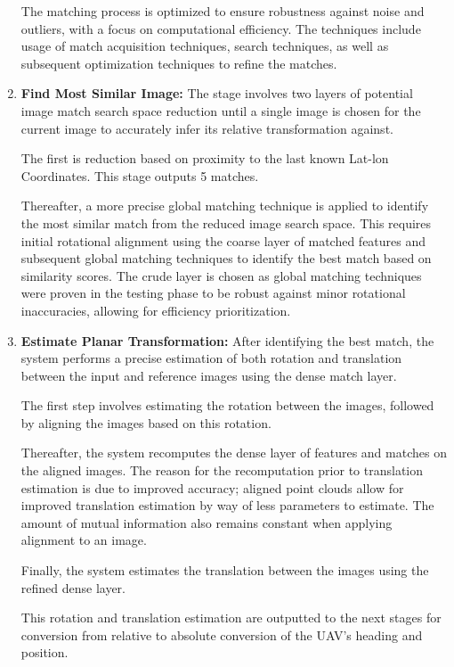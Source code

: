 \begin{enumerate}
    The matching process is optimized to ensure robustness against noise and outliers, with a focus on computational efficiency. The techniques include usage of match acquisition techniques, search techniques, as well as subsequent optimization techniques to refine the matches.
    
    \item \textbf{Find Most Similar Image:}  
    The stage involves two layers of potential image match search space reduction until a single image is chosen for the current image to accurately infer its relative transformation against. 
    
    The first is reduction based on proximity to the last known Lat-lon Coordinates. This stage outputs 5 matches. 
    
    Thereafter, a more precise global matching technique is applied to identify the most similar match from the reduced image search space. This requires initial rotational alignment using the coarse layer of matched features and subsequent global matching techniques to identify the best match based on similarity scores. The crude layer is chosen as global matching techniques were proven in the testing phase to be robust against minor rotational inaccuracies, allowing for efficiency prioritization. 


    \item \textbf{Estimate Planar Transformation:}  
    After identifying the best match, the system performs a precise estimation of both rotation and translation between the input and reference images using the dense match layer. 
    
    The first step involves estimating the rotation between the images, followed by aligning the images based on this rotation. 
    
    Thereafter, the system recomputes the dense layer of features and matches on the aligned images. The reason for the recomputation prior to translation estimation is due to improved accuracy; aligned point clouds allow for improved translation estimation by way of less parameters to estimate. The amount of mutual information also remains constant when applying alignment to an image. 

    Finally, the system estimates the translation between the images using the refined dense layer. 

    This rotation and translation estimation are outputted to the next stages for conversion from relative to absolute conversion of the UAV's heading and position. 


\end{enumerate}
